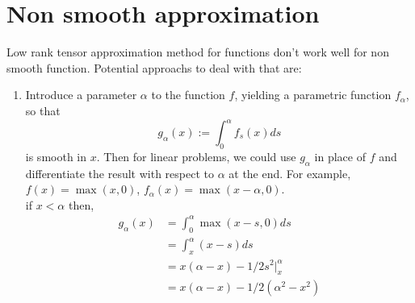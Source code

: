 \documentclass{article}
\begin{document}
\section{Non smooth approximation}
Low rank tensor approximation method for functions don't work well for non smooth function.
Potential approachs to deal with that are:
\begin{enumerate}
    \item Introduce a parameter $\alpha$ to the function $f$, yielding a parametric function $f_\alpha$, so that 
    $$g_\alpha(x):=\int_0^\alpha f_s(x)ds$$
    is smooth in $x$. Then for linear problems, we could use $g_\alpha$  in place of $f$ and differentiate the result with respect to $\alpha$ at the end. For 
    example, $f(x)=\max(x,0)$, $f_\alpha(x) = \max(x-\alpha,0)$.
    \\
    if $x<\alpha$ then, 
    \begin{align*}
        g_\alpha (x) &= \int_0^\alpha \max(x-s,0)ds\\
        &= \int_x^\alpha (x-s) ds  \\
         &= x(\alpha-x) -1/2s^2 |_x^\alpha   \\
        &= x(\alpha-x) -1/2(\alpha^2 - x^2)
    \end{align*}


\end{enumerate}
\end{document}
